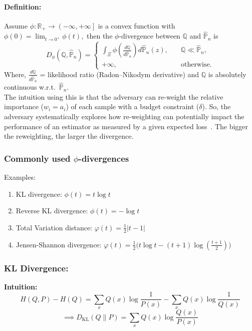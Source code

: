 \documentclass[11pt]{report}
\begin{document}
\paragraph{Definition:} Assume $\phi : \mathbb{R}_{+} \to \left(-\infty, +\infty\right]$ is a convex function with $\phi(0) = \lim_{t \to 0^+} \phi(t),$ then the $\phi$-divergence between $\mathbb{Q}$ and $\hat{\mathbb{P}}_n$ is
\[
D_{\phi}(\mathbb{Q}, \hat{\mathbb{P}}_{n}) = 
    \begin{cases}
        \displaystyle \int_{\Xi} \phi \left(\frac{d\mathbb{Q}}{d\hat{\mathbb{P}}_{n}} \right) d\hat{\mathbb{P}}_{n}(z), & \quad \mathbb{Q} \ll \hat{\mathbb{P}}_{n}, \\
        +\infty, & \quad \text{otherwise}.
    \end{cases}
\]
Where, $\tfrac{d\mathbb{Q}}{d\hat{\mathbb{P}}_{n}}$ = likelihood ratio (Radon–Nikodym derivative) and $\mathbb{Q}$ is absolutely continuous w.r.t.\ $\hat{\mathbb{P}}_n$.\\
The intuition using this is that the adversary can re-weight the relative importance ($w_i = a_i$) of each
sample with a budget constraint ($\delta$). So, the adversary systematically explores how re-weighting can potentially
impact the performance of an estimator as measured by a given expected loss~\cite{duchi2021learning}. The bigger the reweighting, the larger the divergence.

\subsubsection*{Commonly used $\phi$-divergences}
Examples:
\begin{enumerate}
    \item KL divergence: $\phi(t) = t \log t$
    \item Reverse KL divergence: $\phi(t) = -\log t$
    \item Total Variation distance: $\varphi(t) = \tfrac{1}{2} |t - 1|$
    \item Jensen-Shannon divergence: $\varphi(t) = \tfrac{1}{2} \big( t \log t - (t+1)\log (\tfrac{t+1}{2}) \big)$
\end{enumerate}

\subsubsection*{KL Divergence:}
\textbf{Intuition:} 
\[
H(Q, P) - H(Q) 
= \sum_x Q(x) \log \frac{1}{P(x)} - \sum_x Q(x)\log \frac{1}{Q(x)}
\]
\[
\implies D_{\mathrm{KL}}(Q \| P) = \sum_x Q(x) \log \frac{Q(x)}{P(x)} 
\]
\end{document}
